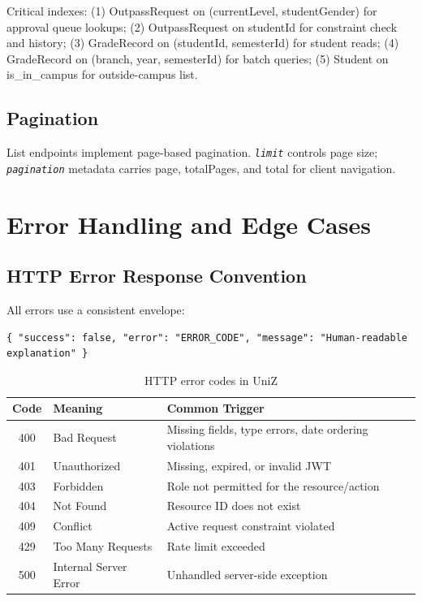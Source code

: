 \documentclass[12pt,a4paper]{report}
\newcommand{\field}[1]{\texttt{\textit{#1}}}
\begin{document}
Critical indexes: (1) OutpassRequest on (currentLevel, studentGender) for approval queue lookups; (2) OutpassRequest on studentId for constraint check and history; (3) GradeRecord on (studentId, semesterId) for student reads; (4) GradeRecord on (branch, year, semesterId) for batch queries; (5) Student on is\_in\_campus for outside-campus list.

\section{Pagination}

List endpoints implement page-based pagination. \field{limit} controls page size; \field{pagination} metadata carries page, totalPages, and total for client navigation.

\chapter{Error Handling and Edge Cases}

\section{HTTP Error Response Convention}

All errors use a consistent envelope:
\begin{lstlisting}[caption={Standard error response},label={lst:error}]
{ "success": false, "error": "ERROR_CODE", "message": "Human-readable explanation" }
\end{lstlisting}

\begin{table}[H]
\centering
\caption{HTTP error codes in UniZ}
\label{tab:errors}
\renewcommand{\arraystretch}{1.2}
\begin{tabular}{cll}
\toprule
\textbf{Code} & \textbf{Meaning} & \textbf{Common Trigger} \\
\midrule
400 & Bad Request        & Missing fields, type errors, date ordering violations \\
401 & Unauthorized       & Missing, expired, or invalid JWT \\
403 & Forbidden          & Role not permitted for the resource/action \\
404 & Not Found          & Resource ID does not exist \\
409 & Conflict           & Active request constraint violated \\
429 & Too Many Requests  & Rate limit exceeded \\
500 & Internal Server Error & Unhandled server-side exception \\
\bottomrule
\end{tabular}
\end{table}
\end{document}
